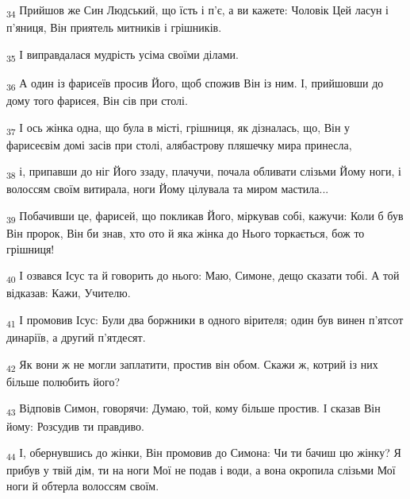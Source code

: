 \begin{tcolorbox}
\textsubscript{34} Прийшов же Син Людський, що їсть і п'є, а ви кажете: Чоловік Цей ласун і п'яниця, Він приятель митників і грішників.
\end{tcolorbox}
\begin{tcolorbox}
\textsubscript{35} І виправдалася мудрість усіма своїми ділами.
\end{tcolorbox}
\begin{tcolorbox}
\textsubscript{36} А один із фарисеїв просив Його, щоб спожив Він із ним. І, прийшовши до дому того фарисея, Він сів при столі.
\end{tcolorbox}
\begin{tcolorbox}
\textsubscript{37} І ось жінка одна, що була в місті, грішниця, як дізналась, що, Він у фарисеєвім домі засів при столі, алябастрову пляшечку мира принесла,
\end{tcolorbox}
\begin{tcolorbox}
\textsubscript{38} і, припавши до ніг Його ззаду, плачучи, почала обливати слізьми Йому ноги, і волоссям своїм витирала, ноги Йому цілувала та миром мастила...
\end{tcolorbox}
\begin{tcolorbox}
\textsubscript{39} Побачивши це, фарисей, що покликав Його, міркував собі, кажучи: Коли б був Він пророк, Він би знав, хто ото й яка жінка до Нього торкається, бож то грішниця!
\end{tcolorbox}
\begin{tcolorbox}
\textsubscript{40} І озвався Ісус та й говорить до нього: Маю, Симоне, дещо сказати тобі. А той відказав: Кажи, Учителю.
\end{tcolorbox}
\begin{tcolorbox}
\textsubscript{41} І промовив Ісус: Були два боржники в одного вірителя; один був винен п'ятсот динаріїв, а другий п'ятдесят.
\end{tcolorbox}
\begin{tcolorbox}
\textsubscript{42} Як вони ж не могли заплатити, простив він обом. Скажи ж, котрий із них більше полюбить його?
\end{tcolorbox}
\begin{tcolorbox}
\textsubscript{43} Відповів Симон, говорячи: Думаю, той, кому більше простив. І сказав Він йому: Розсудив ти правдиво.
\end{tcolorbox}
\begin{tcolorbox}
\textsubscript{44} І, обернувшись до жінки, Він промовив до Симона: Чи ти бачиш цю жінку? Я прибув у твій дім, ти на ноги Мої не подав і води, а вона окропила слізьми Мої ноги й обтерла волоссям своїм.
\end{tcolorbox}
